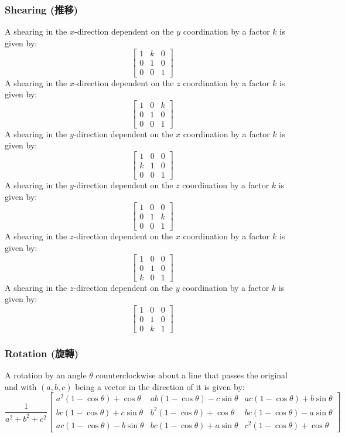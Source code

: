 \documentclass[a4paper,12pt]{report}
\begin{document}
\subsubsection{Shearing (推移)}
A shearing in the $x$-direction dependent on the $y$ coordination by a factor $k$ is given by:
\[\begin{bmatrix}
1 & k & 0 \\
0 & 1 & 0 \\
0 & 0 & 1
\end{bmatrix}\]
A shearing in the $x$-direction dependent on the $z$ coordination by a factor $k$ is given by:
\[\begin{bmatrix}
1 & 0 & k \\
0 & 1 & 0 \\
0 & 0 & 1
\end{bmatrix}\]
A shearing in the $y$-direction dependent on the $x$ coordination by a factor $k$ is given by:
\[\begin{bmatrix}
1 & 0 & 0 \\
k & 1 & 0 \\
0 & 0 & 1
\end{bmatrix}\]
A shearing in the $y$-direction dependent on the $z$ coordination by a factor $k$ is given by:
\[\begin{bmatrix}
1 & 0 & 0 \\
0 & 1 & k \\
0 & 0 & 1
\end{bmatrix}\]
A shearing in the $z$-direction dependent on the $x$ coordination by a factor $k$ is given by:
\[\begin{bmatrix}
1 & 0 & 0 \\
0 & 1 & 0 \\
k & 0 & 1
\end{bmatrix}\]
A shearing in the $z$-direction dependent on the $y$ coordination by a factor $k$ is given by:
\[\begin{bmatrix}
1 & 0 & 0 \\
0 & 1 & 0 \\
0 & k & 1
\end{bmatrix}\]
\subsubsection{Rotation (旋轉)}
A rotation by an angle $\theta$ counterclockwise about a line that passes the original and with $(a,b,c)$ being a vector in the direction of it is given by:
\[\frac{1}{a^2+b^2+c^2}\begin{bmatrix}
a^2(1-\cos\theta)+\cos\theta & ab(1-\cos\theta)-c\sin\theta & ac(1-\cos\theta )+b\sin\theta\\
bc(1-\cos\theta )+c\sin\theta & b^2(1-\cos\theta )+\cos\theta & bc(1-\cos\theta )-a\sin\theta\\
ac(1-\cos\theta )-b\sin\theta & bc(1-\cos\theta )+a\sin\theta & c^2(1-\cos\theta )+\cos\theta \end{bmatrix}\]
\end{document}
